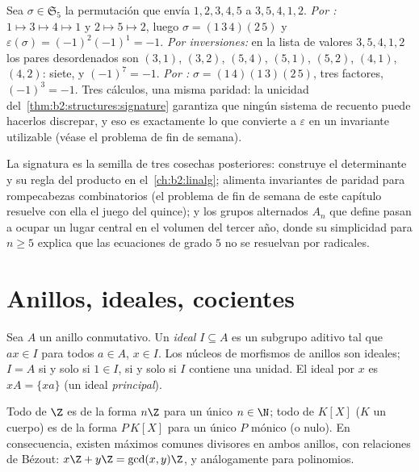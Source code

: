 \begin{example}\label{ex:b2:structures:threeroads}
Sea $\sigma \in \mathfrak{S}_5$ la permutación que envía $1, 2, 3,
4, 5$ a $3, 5, 4, 1, 2$. \emph{Por :} $1 \mapsto 3 \mapsto
4 \mapsto 1$ y $2 \mapsto 5 \mapsto 2$, luego $\sigma =
(1\,3\,4)(2\,5)$ y $\varepsilon(\sigma) = (-1)^{2}(-1)^{1} = -1$.
\emph{Por inversiones:} en la lista de valores $3, 5, 4, 1, 2$ los
pares desordenados son $(3,1)$, $(3,2)$, $(5,4)$, $(5,1)$,
$(5,2)$, $(4,1)$, $(4,2)$: siete, y $(-1)^7 = -1$. \emph{Por
:} $\sigma = (1\,4)(1\,3)(2\,5)$, tres factores,
$(-1)^3 = -1$. Tres cálculos, una misma paridad: la unicidad del~\cref{thm:b2:structures:signature} garantiza que ningún sistema de
recuento puede hacerlos discrepar, y eso es exactamente lo que
convierte a $\varepsilon$ en un invariante utilizable (véase el
problema de fin de semana).
\end{example}

\begin{remark}
La signatura es la semilla de tres cosechas posteriores: construye
el determinante y su regla del producto en el~\cref{ch:b2:linalg};
alimenta invariantes de paridad para rompecabezas combinatorios (el
problema de fin de semana de este capítulo resuelve con ella el
juego del quince); y los grupos alternados $A_n$ que define pasan a
ocupar un lugar central en el volumen del tercer año, donde su
simplicidad para $n \geq 5$ explica que las ecuaciones de grado $5$
no se resuelvan por radicales.
\end{remark}

\section{Anillos, ideales, cocientes}

\begin{definition}[Ideal]\label{def:b2:structures:ideal}
Sea $A$ un anillo conmutativo. Un \emph{ideal} $I
\subseteq A$ es un subgrupo aditivo tal que $a x \in I$ para todos
$a \in A$, $x \in I$. Los núcleos de morfismos de anillos son
ideales; $I = A$ si y solo si $1 \in I$, si y solo si $I$ contiene
una unidad. El ideal \emph{} por $x$ es $xA = \{xa\}$ (un
ideal \emph{principal}).
\end{definition}

\begin{theorem}[{Ideales de $\Z$ y de $K[X]$}]\label{thm:b2:structures:principal}
Todo  de $\Z$ es de la forma $n\Z$ para un único $n \in \N$;
todo  de $K[X]$ ($K$ un cuerpo) es de la forma $P\,K[X]$ para un
único $P$ mónico (o nulo). En consecuencia, existen máximos comunes
divisores en ambos anillos, con relaciones de Bézout: $x\Z + y\Z =
\gcd(x,y)\Z$, y análogamente para polinomios.
\end{theorem}


